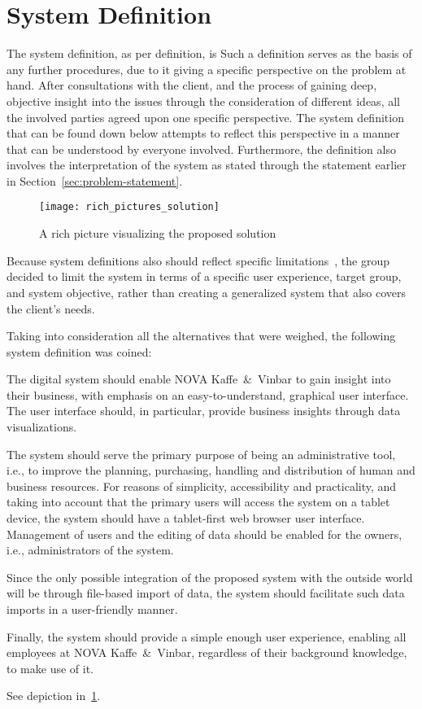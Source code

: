 \section{System Definition}\label{sec:system-definition}

The system definition, as per definition, is
Such a definition serves as the basis of any further procedures, due to it giving a specific perspective on the problem
at hand.
After consultations with the client, and the process of gaining deep, objective insight into the issues through the
consideration of different ideas, all the involved parties agreed upon one specific perspective.
The system definition that can be found down below attempts to reflect this perspective in a manner that can be
understood by everyone involved.
Furthermore, the definition also involves the interpretation of the system as stated through the statement earlier in
Section~\ref{sec:problem-statement}.

\begin{figure}
    \centering
    \texttt{[image: rich\_pictures\_solution]}
    \caption{A rich picture visualizing the proposed solution}\label{fig:pda-solution}
\end{figure}

Because system definitions also should reflect specific limitations~\cite[38]{mathiassen2018}, the group decided to
limit the system in terms of a specific user experience, target group, and system objective, rather than creating a
generalized system that also covers the client's needs.

Taking into consideration all the alternatives that were weighed, the following system definition was coined:
\begin{tcolorbox}[title=System definition]
    The digital system should enable NOVA Kaffe~\&~Vinbar to gain insight into their business, with emphasis on an
    easy-to-understand, graphical user interface.
    The user interface should, in particular, provide business insights through data visualizations.

    The system should serve the primary purpose of being an administrative tool, i.e., to improve the planning,
    purchasing, handling and distribution of human and business resources.
    For reasons of simplicity, accessibility and practicality, and taking into account that the primary users will
    access the system on a tablet device, the system should have a tablet-first web browser user interface.
    Management of users and the editing of data should be enabled for the owners, i.e., administrators of the system.

    Since the only possible integration of the proposed system with the outside world will be through file-based import
    of data, the system should facilitate such data imports in a user-friendly manner.

    Finally, the system should provide a simple enough user experience, enabling all employees at NOVA Kaffe~\&~Vinbar,
    regardless of their background knowledge, to make use of it.
\end{tcolorbox}

See depiction in~\ref{fig:pda-solution}.
